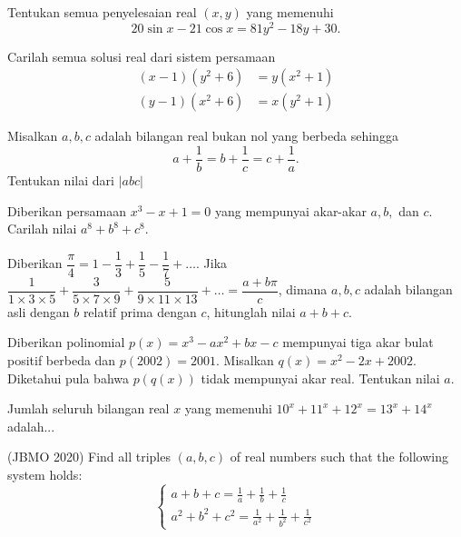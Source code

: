 \documentclass[11pt]{scrartcl}
\begin{document}
    \begin{soalbaru}
    Tentukan semua penyelesaian real $(x,y)$ yang memenuhi
    $$20\sin x-21 \cos x = 81y^2-18y+30.$$
    \end{soalbaru}
    
    \begin{soalbaru}
    Carilah semua solusi real dari sistem persamaan
    \begin{align*}
        (x-1)(y^2+6) &= y(x^2+1)\\
        (y-1)(x^2+6) &= x(y^2+1)
    \end{align*}
    \end{soalbaru}
    
    \begin{soalbaru}
    Misalkan $a,b,c$ adalah bilangan real bukan nol yang berbeda sehingga 
    $$a+\dfrac{1}{b}=b+\dfrac{1}{c}=c+\dfrac{1}{a}.$$
    Tentukan nilai dari $|abc|$
    \end{soalbaru}
    
    \begin{soalbaru}
		Diberikan persamaan $x^3-x+1=0$ yang mempunyai akar-akar $a,b,$ dan $c$. Carilah nilai $a^8+b^8+c^8$.
	\end{soalbaru}
	
	\begin{soalbaru}
			Diberikan $\dfrac{\pi}{4} = 1 - \dfrac{1}{3}+\dfrac{1}{5}-\dfrac{1}{7}+\dots$. Jika  $\dfrac{1}{1 \times 3 \times 5}+\dfrac{3}{5 \times 7 \times 9}+\dfrac{5}{9 \times 11 \times 13}+\dots = \dfrac{a+b\pi}{c}$, dimana $a,b,c$ adalah bilangan asli dengan $b$ relatif prima dengan $c$, hitunglah nilai $a+b+c$.
		\end{soalbaru}
	
	\begin{soalbaru}
		Diberikan polinomial $p(x)=x^3-ax^2+bx-c$ mempunyai tiga akar bulat positif berbeda dan $p(2002)=2001$. Misalkan $q(x)=x^2-2x+2002$. Diketahui pula bahwa $p(q(x))$ tidak mempunyai akar real. Tentukan nilai $a$.
	\end{soalbaru}
	
	\begin{soalbaru}
		Jumlah seluruh bilangan real $x$ yang memenuhi $10^x+11^x+12^x=13^x+14^x$ adalah... %
	\end{soalbaru}

    \begin{soalbaru}(JBMO 2020)
    Find all triples $(a,b,c)$ of real numbers such that the following system holds:
$$\begin{cases} a+b+c=\frac{1}{a}+\frac{1}{b}+\frac{1}{c} \\a^2+b^2+c^2=\frac{1}{a^2}+\frac{1}{b^2}+\frac{1}{c^2}\end{cases}$$
    \end{soalbaru}
    
\end{document}
